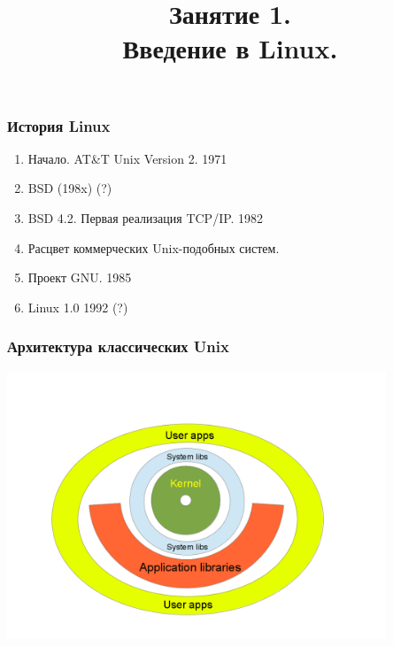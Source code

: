 

\title[SaM Solutions. Linux QA Training]
{
  Занятие 1.\\
  Введение в Linux.
}



\begin{frame}
  \titlepage
\end{frame}

\begin{frame}
  \frametitle{История Linux}

  \begin{enumerate}
    \item Начало. AT\&T Unix Version 2. 1971
    \item BSD (198x) (?)
    \item BSD 4.2. Первая реализация TCP/IP. 1982
    \item Расцвет коммерческих Unix-подобных систем.
    \item Проект GNU. 1985 
    \item Linux 1.0 1992 (?)
  \end{enumerate}

\end{frame}

\begin{frame}
  \frametitle{Архитектура классических Unix}
    \includegraphics[height=8cm]{clipart/classic-unix-arch}
\end{frame}


